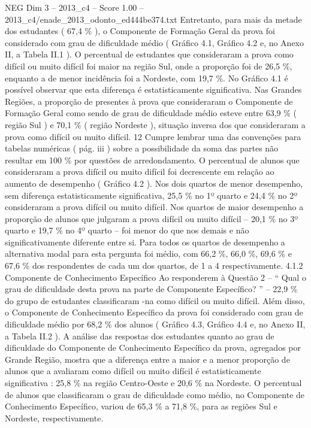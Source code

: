 \begin{textsample}{NEG Dim 3 – 2013\_c4 – Score 1.00 – 2013\_c4/enade\_2013\_odonto\_ed444be374.txt}
Entretanto, para mais da metade dos estudantes ( 67,4 \% ), o Componente de Formação Geral da prova foi considerado com grau de dificuldade médio ( Gráfico 4.1, Gráfico 4.2 e, no Anexo II, a Tabela II.1 ).
O percentual de estudantes que consideraram a prova como difícil ou muito difícil foi maior na região Sul, onde a proporção foi de 26,5 \%, enquanto a de menor incidência foi a Nordeste, com 19,7 \%.
No Gráfico 4.1 é possível observar que esta diferença é estatisticamente significativa.
Nas Grandes Regiões, a proporção de presentes à prova que consideraram o Componente de Formação Geral como sendo de grau de dificuldade médio esteve entre 63,9 \% ( região Sul ) e 70,1 \% ( região Nordeste ), situação inversa dos que consideraram a prova como difícil ou muito difícil. 12 Cumpre lembrar uma das convenções para tabelas numéricas ( pág. iii ) sobre a possibilidade da soma das partes não resultar em 100 \% por questões de arredondamento.
O percentual de alunos que consideraram a prova difícil ou muito difícil foi decrescente em relação ao aumento de desempenho ( Gráfico 4.2 ).
Nos dois quartos de menor desempenho, sem diferença estatisticamente significativa, 25,5 \% no 1º quarto e 24,4 \% no 2º consideraram a prova difícil ou muito difícil.
Nos quartos de maior desempenho a proporção de alunos que julgaram a prova difícil ou muito difícil – 20,1 \% no 3º quarto e 19,7 \% no 4º quarto – foi menor do que nos demais e não significativamente diferente entre si.
Para todos os quartos de desempenho a alternativa modal para esta pergunta foi médio, com 66,2 \%, 66,0 \%, 69,6 \% e 67,6 \% dos respondentes de cada um dos quartos, de 1 a 4 respectivamente. 4.1.2 Componente de Conhecimento Específico Ao responderem à Questão 2 – “ Qual o grau de dificuldade desta prova na parte de Componente Específico? ” – 22,9 \% do grupo de estudantes classificaram -na como difícil ou muito difícil.
Além disso, o Componente de Conhecimento Específico da prova foi considerado com grau de dificuldade médio por 68,2 \% dos alunos ( Gráfico 4.3, Gráfico 4.4 e, no Anexo II, a Tabela II.2 ).
A análise das respostas dos estudantes quanto ao grau de dificuldade do Componente de Conhecimento Específico da prova, agregados por Grande Região, mostra que a diferença entre a maior e a menor proporção de alunos que a avaliaram como difícil ou muito difícil é estatisticamente significativa : 25,8 \% na região Centro-Oeste e 20,6 \% na Nordeste.
O percentual de alunos que classificaram o grau de dificuldade como médio, no Componente de Conhecimento Específico, variou de 65,3 \% a 71,8 \%, para as regiões Sul e Nordeste, respectivamente.

\end{textsample}
